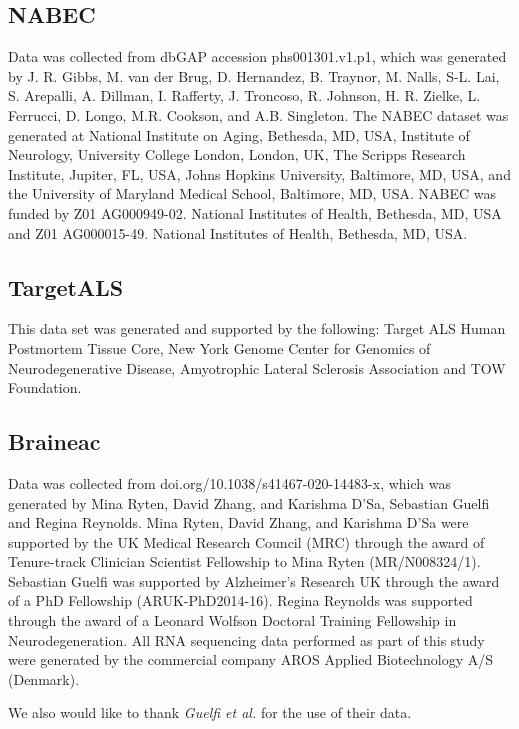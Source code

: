 \subsection*{NABEC}
Data was collected from dbGAP accession phs001301.v1.p1, which was generated by J. R. Gibbs, M. van der Brug, D. Hernandez, B. Traynor, M. Nalls, S-L. Lai, S. Arepalli, A. Dillman, I. Rafferty, J. Troncoso, R. Johnson, H. R. Zielke, L. Ferrucci, D. Longo, M.R. Cookson, and A.B. Singleton. The NABEC dataset was generated at National Institute on Aging, Bethesda, MD, USA, Institute of Neurology, University College London, London, UK, The Scripps Research Institute, Jupiter, FL, USA, Johns Hopkins University, Baltimore, MD, USA, and the University of Maryland Medical School, Baltimore, MD, USA. NABEC was funded by Z01 AG000949-02. National Institutes of Health, Bethesda, MD, USA and Z01 AG000015-49. National Institutes of Health, Bethesda, MD, USA. 

\subsection*{TargetALS}

This data set was generated and supported by the following: Target ALS Human Postmortem Tissue Core, New York Genome Center for Genomics of Neurodegenerative Disease, Amyotrophic Lateral Sclerosis Association and TOW Foundation. 

\subsection*{Braineac}

Data was collected from doi.org/10.1038/s41467-020-14483-x, which was generated by Mina Ryten, David Zhang, and Karishma D’Sa, Sebastian Guelfi and Regina Reynolds. Mina Ryten, David Zhang, and Karishma D’Sa were supported by the UK Medical Research Council (MRC) through the award of Tenure-track Clinician Scientist Fellowship to Mina Ryten (MR/N008324/1). Sebastian Guelfi was supported by Alzheimer’s Research UK through the award of a PhD Fellowship (ARUK-PhD2014-16). Regina Reynolds was supported through the award of a Leonard Wolfson Doctoral Training Fellowship in Neurodegeneration. All RNA sequencing data performed as part of this study were generated by the commercial company AROS Applied Biotechnology A/S (Denmark). 

We also would like to thank \textit{Guelfi et al.}\cite{guelfiRegulatorySitesSplicing2020} for the use of their data. 

